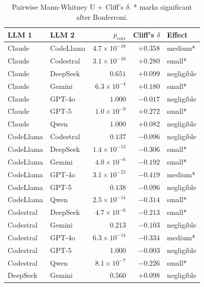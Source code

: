 \documentclass[11pt]{article}
\begin{document}
\begin{table}[H]
\centering
\caption{Pairwise Mann-Whitney U + Cliff's $\delta$. * marks significant after Bonferroni.}
\label{tab:pairwise}
\scriptsize
\setlength{\tabcolsep}{4pt}
\begin{tabular}{@{}llrrl@{}}
\toprule
\textbf{LLM 1} & \textbf{LLM 2} & \textbf{$p_{\text{corr}}$} & \textbf{Cliff's $\delta$} & \textbf{Effect} \\
\midrule
Claude     & CodeLlama  & $4.7\!\times\!10^{-18}$ & $+0.358$ & medium*    \\
Claude     & Codestral  & $3.1\!\times\!10^{-10}$ & $+0.280$ & small*     \\
Claude     & DeepSeek   & $0.651$                 & $+0.099$ & negligible \\
Claude     & Gemini     & $6.3\!\times\!10^{-4}$  & $+0.180$ & small*     \\
Claude     & GPT-4o     & $1.000$                 & $-0.017$ & negligible \\
Claude     & GPT-5      & $1.0\!\times\!10^{-9}$  & $+0.272$ & small*     \\
Claude     & Qwen       & $1.000$                 & $+0.082$ & negligible \\
CodeLlama  & Codestral  & $0.137$                 & $-0.096$ & negligible \\
CodeLlama  & DeepSeek   & $1.4\!\times\!10^{-13}$ & $-0.306$ & small*     \\
CodeLlama  & Gemini     & $4.0\!\times\!10^{-6}$  & $-0.192$ & small*     \\
CodeLlama  & GPT-4o     & $3.1\!\times\!10^{-23}$ & $-0.419$ & medium*    \\
CodeLlama  & GPT-5      & $0.138$                 & $-0.096$ & negligible \\
CodeLlama  & Qwen       & $2.5\!\times\!10^{-14}$ & $-0.314$ & small*     \\
Codestral  & DeepSeek   & $4.7\!\times\!10^{-6}$  & $-0.213$ & small*     \\
Codestral  & Gemini     & $0.213$                 & $-0.103$ & negligible \\
Codestral  & GPT-4o     & $6.3\!\times\!10^{-14}$ & $-0.334$ & medium*    \\
Codestral  & GPT-5      & $1.000$                 & $-0.003$ & negligible \\
Codestral  & Qwen       & $8.1\!\times\!10^{-7}$  & $-0.226$ & small*     \\
DeepSeek   & Gemini     & $0.560$                 & $+0.098$ & negligible \\

\end{tabular}
\end{table}
\end{document}
